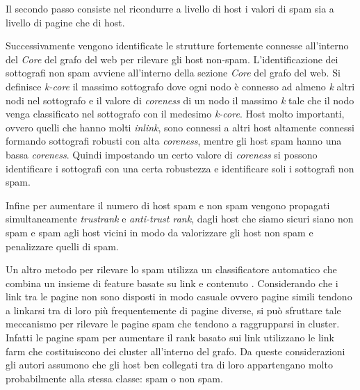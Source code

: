 Il secondo passo consiste nel ricondurre  a livello di host i valori di spam sia a livello di pagine che di host.

Successivamente vengono identificate le strutture fortemente connesse all'interno del \textit{Core} del grafo del web per rilevare gli host non-spam. L'identificazione dei sottografi non spam avviene all'interno della sezione \textit{Core} del grafo del web. Si definisce \textit{k-core} il massimo sottografo dove ogni nodo è connesso ad almeno \textit{k} altri nodi nel sottografo e il valore di \textit{coreness} di un nodo il massimo \textit{k} tale che il nodo venga classificato nel sottografo con il medesimo \textit{k-core}. Host molto importanti, ovvero quelli che hanno molti \textit{inlink}, sono connessi a altri host altamente connessi formando sottografi robusti con alta \textit{coreness}, mentre gli host spam hanno una bassa \textit{coreness}. Quindi impostando un certo valore di \textit{coreness} si possono identificare i sottografi con una certa robustezza e identificare soli i sottografi non spam.

Infine per aumentare il numero di host spam e non spam vengono propagati simultaneamente \textit{trustrank} e \textit{anti-trust rank}, dagli host che siamo sicuri siano non spam e spam agli host vicini in modo da valorizzare gli host non spam e penalizzare quelli di spam.

Un altro metodo per rilevare lo spam utilizza un classificatore automatico che combina un insieme di feature basate su link e contenuto \cite{Castillo:2007:KYN:1277741.1277814}. Considerando che i link tra le pagine non sono disposti in modo casuale ovvero pagine simili tendono a linkarsi tra di loro più frequentemente di pagine diverse, si può sfruttare tale meccanismo per rilevare le pagine spam che tendono a raggrupparsi in cluster. Infatti le pagine spam per aumentare il rank basato sui link utilizzano le link farm che costituiscono dei cluster all'interno del grafo. Da queste considerazioni gli autori assumono che gli host ben collegati tra di loro appartengano molto probabilmente alla stessa classe: spam o non spam.


